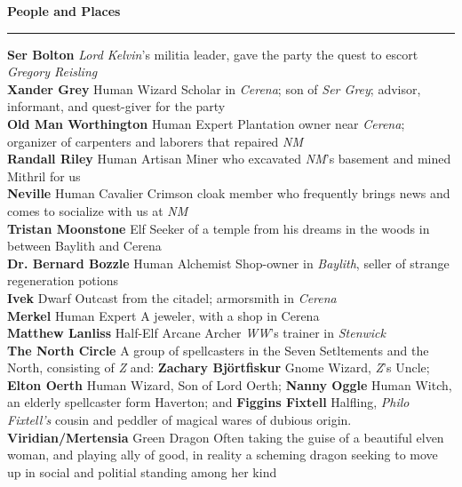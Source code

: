 \documentclass[letterpaper]{article}
\newcommand{\e}[1]{\emph{#1}}
\newcommand{\B}[1]{\textbf{#1}}
\newenvironment{notesection}[1]
{ {\huge \B{#1}}\hrule\vspace{0.5em}\begingroup\fontsize{9pt}{12pt}\selectfont}
{\endgroup}
\newcommand{\person}[3]{\B{#1
    \ifstrequal{#2}{M}{{\color{ProcessBlue}\male}}{%
    \ifstrequal{#2}{F}{\color{VioletRed}\female}{}}}{\scriptsize #3}}
\begin{document}
\begin{notesection}{People and Places}
\person{Ser Bolton}{M}{} \e{Lord Kelvin}'s militia leader, gave the party the quest to escort \e{Gregory Reisling} \\
\person{Xander Grey}{M}{Human Wizard} Scholar in \e{Cerena}; son of \e{Ser Grey}; advisor, informant, and quest-giver for the party\\
\person{Old Man Worthington}{M}{Human Expert} Plantation owner near \e{Cerena}; organizer of carpenters and laborers that repaired \e{NM}\\
\person{Randall Riley}{M}{Human Artisan} Miner who excavated \e{NM}'s basement and mined Mithril for us\\
\person{Neville}{M}{Human Cavalier} Crimson cloak member who frequently brings news and comes to socialize with us at \e{NM}\\
\person{Tristan Moonstone}{M}{Elf} Seeker of a temple from his dreams in the woods in between Baylith and Cerena\\
\person{Dr. Bernard Bozzle}{M}{Human Alchemist} Shop-owner in \e{Baylith}, seller of strange regeneration potions\\
\person{Ivek}{M}{Dwarf} Outcast from the citadel; armorsmith in \e{Cerena}\\
\person{Merkel}{F}{Human Expert} A jeweler, with a shop in Cerena\\
\person{Matthew Lanliss}{M}{Half-Elf Arcane Archer} \e{WW}'s trainer in \e{Stenwick}\\
\B{The North Circle} A group of spellcasters in the Seven Setltements and the North, consisting of \e{Z} and: \person{Zachary Bj\"{o}rtfiskur}{M}{Gnome Wizard}, \e{Z}'s Uncle; \person{Elton Oerth}{M}{Human Wizard}, Son of Lord Oerth; \person{Nanny Oggle}{F}{Human Witch}, an elderly spellcaster form Haverton; and \person{Figgins Fixtell}{M}{Halfling}, \e{Philo Fixtell's} cousin and peddler of magical wares of dubious origin. \\
\person{Viridian/Mertensia}{F}{Green Dragon} Often taking the guise of a beautiful elven woman, and playing ally of good, in reality a scheming dragon seeking to move up in social and politial standing among her kind \\


\end{notesection}
\end{document}
